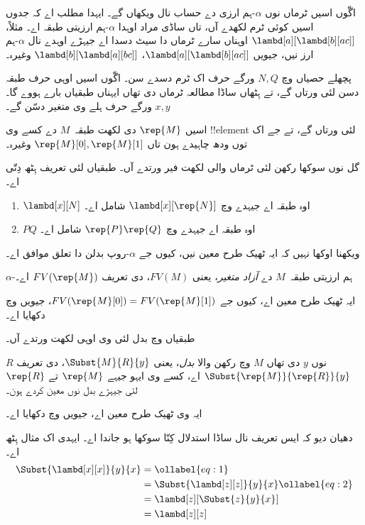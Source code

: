 \documentclass[../../../include/open-logic-section]{subfiles}
\begin{document}

اگّوں اسیں ٹرماں نوں $\alpha$-ہم ارزی دے حساب نال ویکھاں گے۔
ایہدا مطلب اے کہ جدوں اسیں کوئی ٹرم لکھدے آں، تاں ساڈی مراد
اوہدا $\alpha$-ہم ارزیتی طبقہ اے۔ مثلاً، $\lambd[a][\lambd[b][a c]]$
اوہناں سارے ٹرماں دا سیٹ دسدا اے جیہڑے اوہدے نال $\alpha$-ہم ارز نیں،
جیویں $\lambd[a][\lambd[b][a
    c]]$، $\lambd[b][\lambd[a][b c]]$ وغیرہ۔

پچھلے حصیاں وچ $N, Q$ ورگے حرف اک ٹرم دسدے سن۔ اگّوں
اسیں اوہی حرف طبقہ دسن لئی ورتاں گے، تے ہِٹھاں ساڈا مطالعہ
ٹرماں دی تھاں ایہناں طبقیاں بارے ہووے گا۔ $x, y$ ورگے حرف
ہلے وی متغیر دسّن گے۔

اسیں $\rep{M}$ دی لکھت طبقہ~$M$ دے کسے وی !!{element}
لئی ورتاں گے، تے جے اک توں ودھ چاہیدے ہون تاں $\rep{M}[0], \rep{M}[1]$ وغیرہ۔

گل نوں سوکھا رکھن لئی ٹرماں والی لکھت فیر ورتدے آں۔
طبقیاں لئی تعریف ہِٹھ دِتّی اے۔
\begin{defn}
  \begin{enumerate}
  \item $\lambd[x][N]$ اوہ طبقہ اے جیہدے وچ
    $\lambd[x][\rep{N}]$ شامل اے۔
  \item $PQ$ اوہ طبقہ اے جیہدے وچ $\rep{P}\rep{Q}$ شامل اے۔
  \end{enumerate}
\end{defn}

ویکھنا اوکھا نہیں کہ ایہ ٹھیک طرح معین نیں، کیوں جے
$\alpha$-روپ بدلن دا تعلق موافق اے۔

\begin{defn} 
  $\alpha$-ہم ارزیتی طبقہ~$M$ دے \emph{آزاد متغیر}، یعنی
  $FV(M)$، دی تعریف $FV(\rep{M})$ اے۔
\end{defn}

ایہ ٹھیک طرح معین اے، کیوں جے $FV(\rep{M}[0]) =
FV(\rep{M}[1])$، جیویں  وچ دکھایا اے۔

طبقیاں وچ بدل لئی وی اوہی لکھت ورتدے آں۔
\begin{defn} 
  $R$ نوں $y$ دی تھاں $M$ وچ رکھن والا \emph{بدل}، یعنی
  $\Subst{M}{R}{y}$، دی تعریف $\Subst{\rep{M}}{\rep{R}}{y}$ اے،
  کسے وی ایہو جیہے $\rep{M}$ تے $\rep{R}$ لئی جیہڑے بدل نوں
  معین کردے ہون۔
\end{defn}

ایہ وی ٹھیک طرح معین اے، جیویں  وچ دکھایا اے۔

دھیان دیو کہ ایس تعریف نال ساڈا استدلال کِنّا سوکھا ہو جاندا
اے۔ ایہدی اک مثال ہِٹھ اے۔
\begin{align}
  \Subst{\lambd[x][x]}{y}{x} & =\ollabel{eq:1}\\
  &= \Subst{\lambd[z][z]}{y}{x} \ollabel{eq:2}\\
  &= \lambd[z][\Subst{z}{y}{x}] \\
  &= \lambd[z][z]
\end{align}
\end{document}
